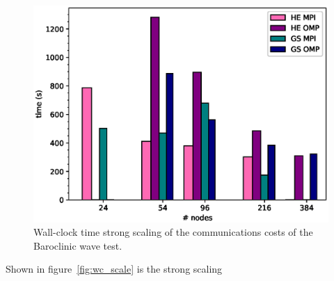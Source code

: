 \begin{figure}
\centering\includegraphics[width=1.0\linewidth]{figs/comms-scale.eps}
\caption{\label{fig:comns_scale}Wall-clock time strong scaling of the 
  communications costs of the Baroclinic wave test.}
\end{figure} 

Shown in figure~\ref{fig:wc_scale} is the strong scaling 